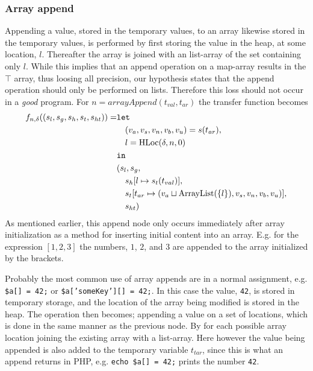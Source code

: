 \subsubsection{Array append}
Appending a value, stored in the temporary values, to an array likewise stored in the temporary values, is performed by first storing the value in the heap, at some location, $l$. Thereafter the array is joined with an list-array of the set containing only $l$. While this implies that an append operation on a map-array results in the $\top$ array, thus loosing all precision, our hypothesis states that the append operation should only be performed on lists. Therefore this loss should not occur in a \emph{good} program. For $n = \mathit{arrayAppend}(t_{val},t_{ar})$ the transfer function becomes
\begin{align}
f_{n,\delta}((s_l, s_g, s_h, s_t, s_{ht})) = & \texttt{let } \notag\\
                                    & \quad (v_a,v_s,v_n,v_b,v_u) = s(t_{ar}), \notag\\
                                    & \quad l = \text{HLoc}(\delta, n, 0)\notag\\
                                    & \texttt{in } \notag\\
                                    &(s_l,s_g,\notag\\
                                    &\quad s_h[l\mapsto s_t(t_{val})], \notag\\
                                    &\quad s_t[t_{ar} \mapsto (v_a \sqcup \text{ArrayList}(\{l\}),v_s, v_n, v_b, v_u)],\notag\\
                                    &\quad s_{ht})
\end{align}
As mentioned earlier, this append node only occurs immediately after array initialization as a method for inserting initial content into an array. E.g. for the expression $[1,2,3]$ the numbers, $1$, $2$, and $3$ are appended to the array initialized by the brackets.

Probably the most common use of array appends are in a normal assignment, e.g. \texttt{\$a[] = 42;} or \texttt{\$a['someKey'][] = 42;}. In this case the value, \texttt{42}, is stored in temporary storage, and the location of the array being modified is stored in the heap. The operation then becomes; appending a value on a set of locations, which is done in the same manner as the previous node. By for each possible array location joining the existing array with a list-array. Here however the value being appended is also added to the temporary variable $t_{tar}$, since this is what an append returns in PHP, e.g. \texttt{echo \$a[] = 42;} prints the number \texttt{42}. 

